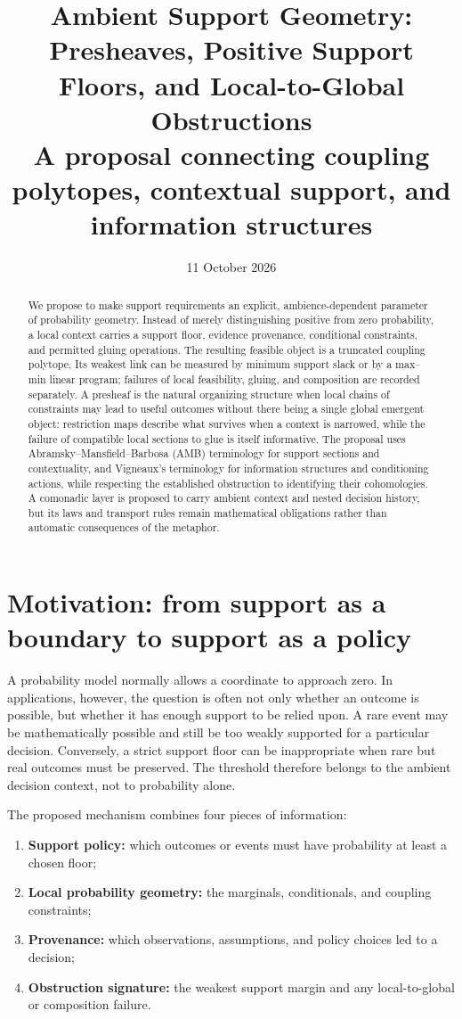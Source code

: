\documentclass[11pt]{article}
\title{\textbf{Ambient Support Geometry: Presheaves, Positive Support Floors, and Local-to-Global Obstructions}\\[.4em]
\large A proposal connecting coupling polytopes, contextual support, and information structures}
\author{}
\date{11 October 2026}
\begin{document}
\maketitle

\begin{abstract}
We propose to make support requirements an explicit, ambience-dependent parameter of probability geometry. Instead of merely distinguishing positive from zero probability, a local context carries a support floor, evidence provenance, conditional constraints, and permitted gluing operations. The resulting feasible object is a truncated coupling polytope. Its weakest link can be measured by minimum support slack or by a max--min linear program; failures of local feasibility, gluing, and composition are recorded separately. A presheaf is the natural organizing structure when local chains of constraints may lead to useful outcomes without there being a single global emergent object: restriction maps describe what survives when a context is narrowed, while the failure of compatible local sections to glue is itself informative. The proposal uses Abramsky--Mansfield--Barbosa (AMB) terminology for support sections and contextuality, and Vigneaux's terminology for information structures and conditioning actions, while respecting the established obstruction to identifying their cohomologies. A comonadic layer is proposed to carry ambient context and nested decision history, but its laws and transport rules remain mathematical obligations rather than automatic consequences of the metaphor.
\end{abstract}

\tableofcontents

\section{Motivation: from support as a boundary to support as a policy}

A probability model normally allows a coordinate to approach zero. In applications, however, the question is often not only whether an outcome is possible, but whether it has enough support to be relied upon. A rare event may be mathematically possible and still be too weakly supported for a particular decision. Conversely, a strict support floor can be inappropriate when rare but real outcomes must be preserved. The threshold therefore belongs to the ambient decision context, not to probability alone.

The proposed mechanism combines four pieces of information:
\begin{enumerate}[leftmargin=2em]
  \item \textbf{Support policy:} which outcomes or events must have probability at least a chosen floor;
  \item \textbf{Local probability geometry:} the marginals, conditionals, and coupling constraints;
  \item \textbf{Provenance:} which observations, assumptions, and policy choices led to a decision;
  \item \textbf{Obstruction signature:} the weakest support margin and any local-to-global or composition failure.
\end{enumerate}
\end{document}

